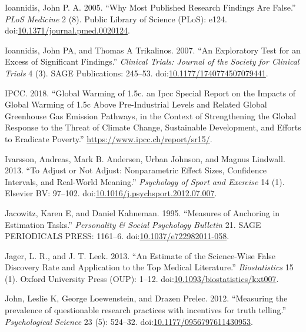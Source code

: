 \documentclass[a5paper]{book}
\begin{document}
\hypertarget{ref-doi:10.1371ux2fjournal.pmed.0020124}{}
Ioannidis, John P. A. 2005. ``Why Most Published Research Findings Are
False.'' \emph{PLoS Medicine} 2 (8). Public Library of Science (PLoS):
e124.
doi:\href{https://doi.org/10.1371/journal.pmed.0020124}{10.1371/journal.pmed.0020124}.

\hypertarget{ref-doi:10.1177ux2f1740774507079441}{}
Ioannidis, John PA, and Thomas A Trikalinos. 2007. ``An Exploratory Test
for an Excess of Significant Findings.'' \emph{Clinical Trials: Journal
of the Society for Clinical Trials} 4 (3). SAGE Publications: 245--53.
doi:\href{https://doi.org/10.1177/1740774507079441}{10.1177/1740774507079441}.

\hypertarget{ref-ipccGlobalWarmingIPCC2018}{}
IPCC. 2018. ``Global Warming of 1.5c. an Ipcc Special Report on the
Impacts of Global Warming of 1.5c Above Pre-Industrial Levels and
Related Global Greenhouse Gas Emission Pathways, in the Context of
Strengthening the Global Response to the Threat of Climate Change,
Sustainable Development, and Efforts to Eradicate Poverty.''
\url{https://www.ipcc.ch/report/sr15/}.

\hypertarget{ref-doi:10.1016ux2fj.psychsport.2012.07.007}{}
Ivarsson, Andreas, Mark B. Andersen, Urban Johnson, and Magnus Lindwall.
2013. ``To Adjust or Not Adjust: Nonparametric Effect Sizes, Confidence
Intervals, and Real-World Meaning.'' \emph{Psychology of Sport and
Exercise} 14 (1). Elsevier BV: 97--102.
doi:\href{https://doi.org/10.1016/j.psychsport.2012.07.007}{10.1016/j.psychsport.2012.07.007}.

\hypertarget{ref-doi:10.1037ux2fe722982011-058}{}
Jacowitz, Karen E, and Daniel Kahneman. 1995. ``Measures of Anchoring in
Estimation Tasks.'' \emph{Personality \& Social Psychology Bulletin} 21.
SAGE PERIODICALS PRESS: 1161--6.
doi:\href{https://doi.org/10.1037/e722982011-058}{10.1037/e722982011-058}.

\hypertarget{ref-doi:10.1093ux2fbiostatisticsux2fkxt007}{}
Jager, L. R., and J. T. Leek. 2013. ``An Estimate of the Science-Wise
False Discovery Rate and Application to the Top Medical Literature.''
\emph{Biostatistics} 15 (1). Oxford University Press (OUP): 1--12.
doi:\href{https://doi.org/10.1093/biostatistics/kxt007}{10.1093/biostatistics/kxt007}.

\hypertarget{ref-doi:10.1177ux2f0956797611430953}{}
John, Leslie K, George Loewenstein, and Drazen Prelec. 2012. ``Measuring
the prevalence of questionable research practices with incentives for
truth telling.'' \emph{Psychological Science} 23 (5): 524--32.
doi:\href{https://doi.org/10.1177/0956797611430953}{10.1177/0956797611430953}.
\end{document}
